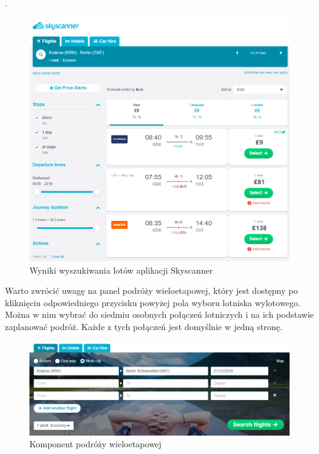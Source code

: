 \documentclass[12pt, twoside]{report}
\begin{document}
.
\begin{figure}[!ht]
\centering
\includegraphics[scale=0.45, keepaspectratio]{skyscanner_result.png}
\caption{Wyniki wyszukiwania lotów aplikacji Skyscanner}
\label{fig:skyscanner_result}
\end{figure}

Warto zwrócić uwagę na panel podróży wieloetapowej, który jest dostępny po kliknięciu  odpowiedniego przycisku powyżej pola  wyboru lotniska wylotowego. Można w nim wybrać do siedmiu osobnych połączeń lotniczych i na ich podstawie zaplanować  podróż. Każde z tych połączeń jest domyślnie  w jedną stronę. 
\begin{figure}[!ht]
\centering
\includegraphics[scale=0.50, keepaspectratio]{skyscanner_multi.png}
\caption{Komponent podróży wieloetapowej}
\label{fig:skyscanner_multi}
\end{figure}
\end{document}
